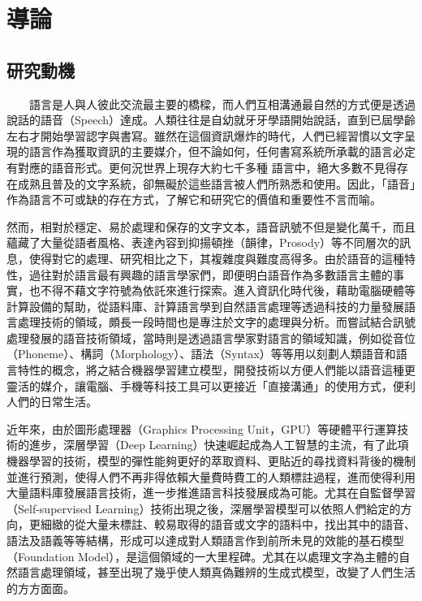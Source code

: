 
\chapter{導論}

\section{研究動機}

　　語言是人與人彼此交流最主要的橋樑，而人們互相溝通最自然的方式便是透過說話的語音（Speech）達成。人類往往是自幼就牙牙學語開始說話，直到已屆學齡左右才開始學習認字與書寫。雖然在這個資訊爆炸的時代，人們已經習慣以文字呈現的語言作為獲取資訊的主要媒介，但不論如何，任何書寫系統所承載的語言必定有對應的語音形式。更何況世界上現存大約七千多種 \cite{eberhard_ethnologue_2024} 語言中，絕大多數不見得存在成熟且普及的文字系統，卻無礙於這些語言被人們所熟悉和使用。因此，「語音」作為語言不可或缺的存在方式，了解它和研究它的價值和重要性不言而喻。

        然而，相對於穩定、易於處理和保存的文字文本，語音訊號不但是變化萬千，而且蘊藏了大量從語者風格、表達內容到抑揚頓挫（韻律，Prosody）等不同層次的訊息，使得對它的處理、研究相比之下，其複雜度與難度高得多。由於語音的這種特性，過往對於語言最有興趣的語言學家們，即便明白語音作為多數語言主體的事實，也不得不藉文字符號為依託來進行探索。進入資訊化時代後，藉助電腦硬體等計算設備的幫助，從語料庫、計算語言學到自然語言處理等透過科技的力量發展語言處理技術的領域，頗長一段時間也是專注於文字的處理與分析。而嘗試結合訊號處理發展的語音技術領域，當時則是透過語言學家對語言的領域知識，例如從音位（Phoneme）、構詞（Morphology）、語法（Syntax）等等用以刻劃人類語音和語言特性的概念，將之結合機器學習建立模型，開發技術以方便人們能以語音這種更靈活的媒介，讓電腦、手機等科技工具可以更接近「直接溝通」的使用方式，便利人們的日常生活。

        近年來，由於圖形處理器（Graphics Processing Unit，GPU）等硬體平行運算技術的進步，深層學習（Deep Learning）快速崛起成為人工智慧的主流，有了此項機器學習的技術，模型的彈性能夠更好的萃取資料、更貼近的尋找資料背後的機制並進行預測，使得人們不再非得依賴大量費時費工的人類標註過程，進而使得利用大量語料庫發展語言技術，進一步推進語言科技發展成為可能。尤其在自監督學習（Self-supervised Learning）技術出現之後，深層學習模型可以依照人們給定的方向，更細緻的從大量未標註、較易取得的語音或文字的語料中，找出其中的語音、語法及語義等等結構，形成可以達成對人類語言作到前所未見的效能的基石模型（Foundation Model），是這個領域的一大里程碑。尤其在以處理文字為主體的自然語言處理領域，甚至出現了幾乎使人類真偽難辨的生成式模型，改變了人們生活的方方面面。

